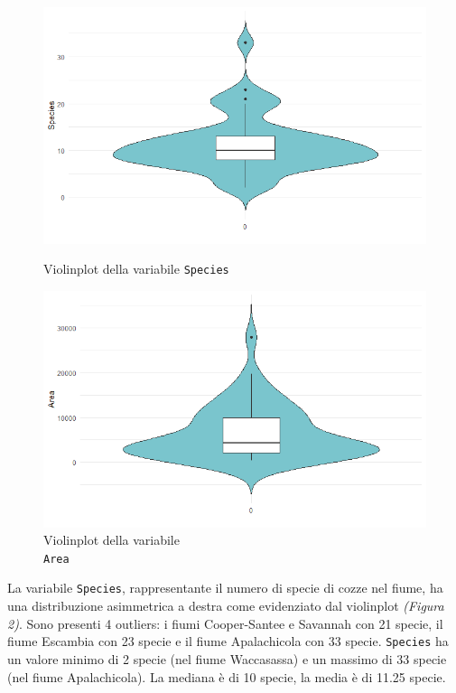 \documentclass{article} %
\begin{document}
\begin{figure}[H]
    \centering
    \begin{minipage}{0.49\textwidth}
        \centering
        \includegraphics[width=\textwidth]{immagini/vp_species.png}
        \captionsetup{justification=centering}
        \caption{Violinplot della variabile \texttt{Species}}
    \end{minipage}
    \hfill
    \begin{minipage}{0.49\textwidth}
        \centering
        \includegraphics[width=\textwidth]{immagini/vp_area.png}
        \captionsetup{justification=centering}
        \caption{Violinplot della variabile\\ \texttt{Area}}
    \end{minipage}
\end{figure}

La variabile \texttt{Species}, rappresentante il numero di specie di cozze nel fiume, ha una distribuzione asimmetrica a destra 
come evidenziato dal violinplot \textit{(Figura 2)}. Sono presenti 4 outliers: i fiumi Cooper-Santee e Savannah con 21 specie, il fiume Escambia con 23 specie e il fiume Apalachicola con 33 specie. \texttt{Species} ha un valore minimo di 2 specie (nel fiume Waccasassa) e un massimo di 33 specie (nel fiume Apalachicola). La mediana è di 10 specie, la media è di 11.25 specie.
\end{document}
